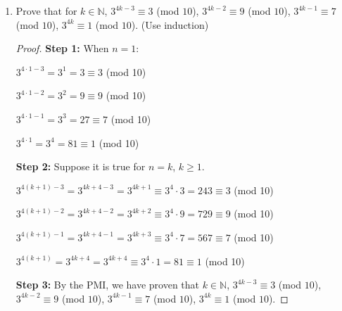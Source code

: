 \documentclass[10pt]{article} %
\newcommand{\N}{\mathbb{N}}
\begin{document}
\begin{enumerate}
\begin{enumerate}
\begin{proof}
  {\bf Step 2:} Suppose it is true for $n=k$, so $10|(2013^k-3^k)$.  Now consider $n=k+1$.  $$2013^{k+1}-3^{k+1}=2013 \cdot 2013^k - 3 \cdot 3^k$$
  
  Now, this means that $\exists m \in \N$ such that $2013^k - 3^k = 10m$ or $2013^k = 10m + 3^k$.  Substituting in this expression, we get: $$2013 \cdot (10m+3^k)-3 \cdot 3^k$$ which can be rewritten as $$10m + 2013 \cdot 3^k - 3 \cdot 3^k=10m+2010 \cdot 3^k=10(m+201 \cdot 3^k)$$
  
  Therefore, $10|(2013^k-3^k)$
  
  {\bf Step 3:} By the principle of mathematical induction, we have proven that for $n\in \N$, $2013^{n}\equiv 3^{n}$ (mod $10$).  
  
  \end{proof}
  
  \bigskip
  
  \item Prove that for $k\in \N$, $3^{4k-3}\equiv 3$ (mod $10$), $3^{4k-2}\equiv 9$ (mod $10$), $3^{4k-1}\equiv 7$ (mod $10$), $3^{4k}\equiv 1$ (mod $10$). (Use induction)
  
  \bigskip
  
  \begin{proof}
  
  
  {\bf Step 1:} When $n=1$:
  
  $3^{4 \cdot 1 - 3}=3^1=3 \equiv 3$ (mod 10)
  
  $3^{4 \cdot 1 - 2}=3^2=9 \equiv 9$ (mod 10)
  
  $3^{4 \cdot 1 - 1}=3^3=27 \equiv 7$ (mod 10)
  
  $3^{4 \cdot 1}=3^4=81 \equiv 1$ (mod 10)
  
  {\bf Step 2:} Suppose it is true for $n=k$, $k \geq 1$.  
  
  $3^{4(k+1)-3}=3^{4k+4-3}=3^{4k+1} \equiv 3^4 \cdot 3 = 243 \equiv 3$ (mod 10)
  
  $3^{4(k+1)-2}=3^{4k+4-2}=3^{4k+2} \equiv 3^4 \cdot 9 = 729 \equiv 9$ (mod 10)
  
  $3^{4(k+1)-1}=3^{4k+4-1}=3^{4k+3} \equiv 3^4 \cdot 7 = 567 \equiv 7$ (mod 10)
  
  $3^{4(k+1)}=3^{4k+4}=3^{4k+4} \equiv 3^4 \cdot 1 = 81 \equiv 1$ (mod 10)
  
  {\bf Step 3:} By the PMI, we have proven that $k\in \N$, $3^{4k-3}\equiv 3$ (mod $10$), $3^{4k-2}\equiv 9$ (mod $10$), $3^{4k-1}\equiv 7$ (mod $10$), $3^{4k}\equiv 1$ (mod $10$).  
  

\end{proof}
\end{enumerate}
\end{enumerate}
\end{document}
